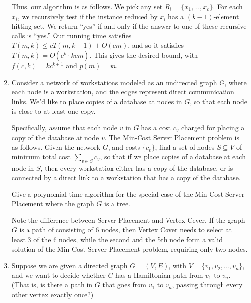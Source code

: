 \documentclass[12pt]{article}
\begin{document}
\begin{enumerate}
{Thus, our algorithm is as follows.
We pick any set $B_i = \{x_1, \ldots, x_c\}$.
For each $x_i$, we recursively test if the
instance reduced by $x_i$ has a $(k-1)$-element hitting set.
We return ``yes'' if and only if the answer to one of
these recursive calls is ``yes.''
Our running time satisfies $T(m,k) \leq c T(m,k-1) + O(cm)$,
and so it satisfies $T(m,k) = O(c^k \cdot kcm)$.
This gives the desired bound, with
$f(c,k) = kc^{k+1}$ and $p(m) = m$.

}


\item

Consider a network of workstations modeled as
an undirected graph $G$, where each node is a workstation, and the edges
represent direct communication links.
We'd like to place copies of a database at nodes in $G$,
so that each node is close to at least one copy.

Specifically, assume that each node $v$ in $G$
has a cost $c_v$ charged for placing a copy of the database at node $v$.
The {\sc Min-Cost Server Placement} problem is as follows.
Given the network $G$, and costs $\{c_v\}$,
find a set of nodes $S \subseteq V$
of minimum total cost $\sum_{v \in S} c_v$, so that
if we place copies of a database at each node in $S$,
then every workstation either has a copy of the database, or is
connected by a direct link to a workstation that has a copy of the database.

Give a polynomial time algorithm for the special case of the
{\sc Min-Cost Server Placement} where the graph $G$ is a tree.

Note the difference between {\sc Server Placement} and {\sc Vertex Cover}.
If the graph $G$ is a path of consisting of 6 nodes, then {\sc Vertex Cover}
needs to select at least 3 of the 6 nodes, while the second and the 5th node
form a valid solution of the
{\sc Min-Cost Server Placement} problem, requiring only two nodes.





\item

Suppose we are given a directed graph $G = (V,E)$,
with $V = \{v_1, v_2, \ldots, v_n\}$, and we want
to decide whether $G$ has a Hamiltonian path
from $v_1$ to $v_n$.
(That is, is there a path in $G$ that goes from
$v_1$ to $v_n$, passing through every other vertex exactly once?)


\end{enumerate}
\end{document}
